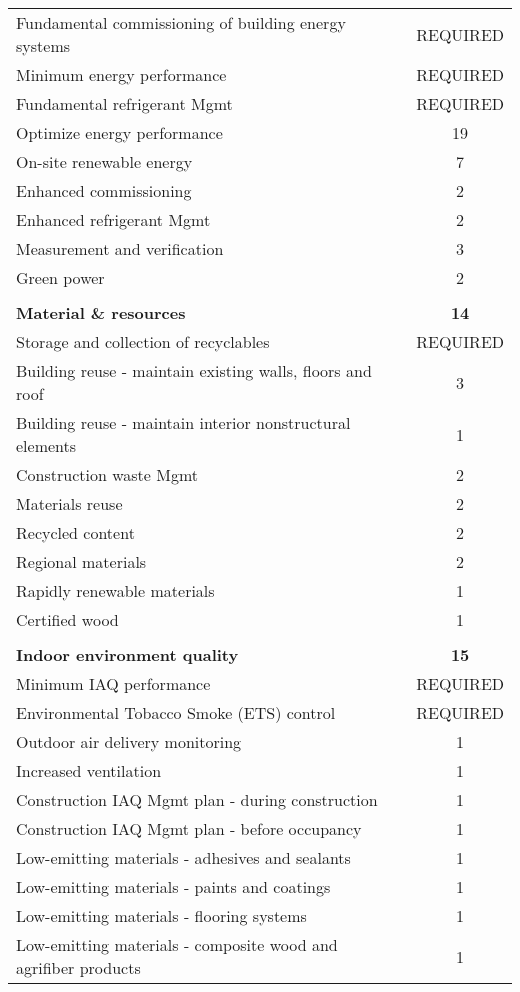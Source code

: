 \documentclass[a4paper,fleqn]{article}
\begin{document}
\begin{longtable}[H]{| l | c |}
	Fundamental commissioning of building energy systems & REQUIRED \\*
	Minimum energy performance & REQUIRED \\*
	Fundamental refrigerant Mgmt & REQUIRED \\*
	Optimize energy performance & 19 \\*
	On-site renewable energy & 7 \\*
	Enhanced commissioning & 2 \\*
	Enhanced refrigerant Mgmt & 2 \\*
	Measurement and verification & 3 \\*
	Green power & 2 \\*
	& \\
	\textbf{Material \& resources} & \textbf{14} \\*
	Storage and collection of recyclables & REQUIRED \\*
	Building reuse - maintain existing walls, floors and roof & 3 \\*
	Building reuse - maintain interior nonstructural elements & 1 \\*
	Construction waste Mgmt & 2 \\*
	Materials reuse & 2 \\*
	Recycled content & 2 \\*
	Regional materials & 2 \\*
	Rapidly renewable materials & 1 \\*
	Certified wood & 1 \\*
	& \\
	\textbf{Indoor environment quality} & \textbf{15} \\*
	Minimum IAQ performance & REQUIRED \\*
	Environmental Tobacco Smoke (ETS) control & REQUIRED \\*
	Outdoor air delivery monitoring & 1 \\*
	Increased ventilation & 1 \\*
	Construction IAQ Mgmt plan - during construction & 1 \\*
	Construction IAQ Mgmt plan - before occupancy & 1 \\*
	Low-emitting materials - adhesives and sealants & 1 \\*
	Low-emitting materials - paints and coatings & 1 \\*
	Low-emitting materials - flooring systems & 1 \\*
	Low-emitting materials - composite wood and agrifiber products & 1 \\*

\end{longtable}
\end{document}
